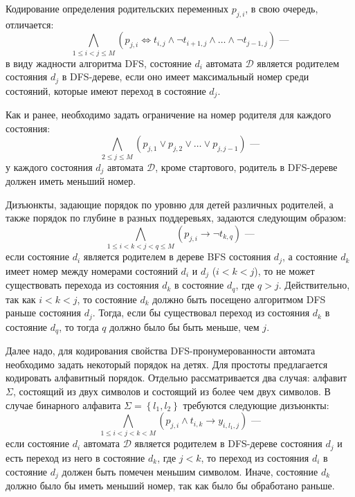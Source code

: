 Кодирование определения родительских переменных $p_{j,i}$, в свою очередь, отличается:
\begin{equation*}
  \bigwedge\limits_{1 \leq i < j \leq M} \left(p_{j,i} \Leftrightarrow t_{i,j} \wedge \neg t_{i+1,j} \wedge \ldots \wedge \neg t_{j-1,j}\right)\text{~---}
\end{equation*}
в виду жадности алгоритма DFS, состояние $d_{i}$ автомата $\mathcal{D}$ является родителем состояния $d_{j}$ в DFS-дереве, если оно имеет максимальный номер среди состояний, которые имеют переход в состояние $d_{j}$.

Как и ранее, необходимо задать ограничение на номер родителя для каждого состояния:
\begin{equation*}
  \bigwedge_{2 \leq j \leq M} \left(p_{j,1} \vee p_{j,2} \vee \ldots \vee p_{j,j - 1}\right) \text{~---}
\end{equation*}
у каждого состояния $d_{j}$ автомата $\mathcal{D}$, кроме стартового, родитель в DFS-дереве должен иметь меньший номер. 

Дизъюнкты, задающие порядок по уровню для детей различных родителей, а также порядок по глубине в разных поддеревьях, задаются следующим образом:
\begin{equation*}
  \bigwedge\limits_{1 \leq i < k < j < q \leq M} (p_{j,i} \rightarrow \neg t_{k,q}) \text{~---}
\end{equation*}
если состояние $d_{i}$ является родителем в дереве BFS состояния $d_{j}$, а состояние $d_{k}$ имеет номер между номерами состояний $d_{i}$ и $d_{j}$ ($i < k < j$), то не может существовать перехода из состояния $d_{k}$ в состояние $d_{q}$, где $q > j$.
Действительно, так как $i < k < j$, то состояние $d_{k}$ должно быть посещено алгоритмом DFS раньше состояния $d_{j}$.
Тогда, если бы существовал переход из состояния $d_{k}$ в состояние $d_{q}$, то тогда $q$ должно было бы быть меньше, чем $j$.

Далее надо, для кодирования свойства DFS-пронумерованности автомата необходимо задать некоторый порядок на детях.
Для простоты предлагается кодировать алфавитный порядок.
Отдельно рассматривается два случая: алфавит $\Sigma$, состоящий из двух символов и состоящий из более чем двух символов.
В случае бинарного алфавита $\Sigma = \left\{l_{1},l_{2}\right\}$ требуются следующие дизъюнкты:
\begin{equation*}
  \bigwedge\limits_{1 \leq i < j < k < M} (p_{j,i} \wedge t_{i,k} \rightarrow y_{i,l_{1},j})\text{~---}
\end{equation*}
если состояние $d_{i}$ автомата $\mathcal{D}$ является родителем в DFS-дереве состояния $d_{j}$ и есть переход из него в состояние $d_{k}$, где $j < k$, то переход из состояния $d_{i}$ в состояние $d_{j}$ должен быть помечен меньшим символом. Иначе, состояние $d_{k}$ должно было бы иметь меньший номер, так как было бы обработано раньше.


